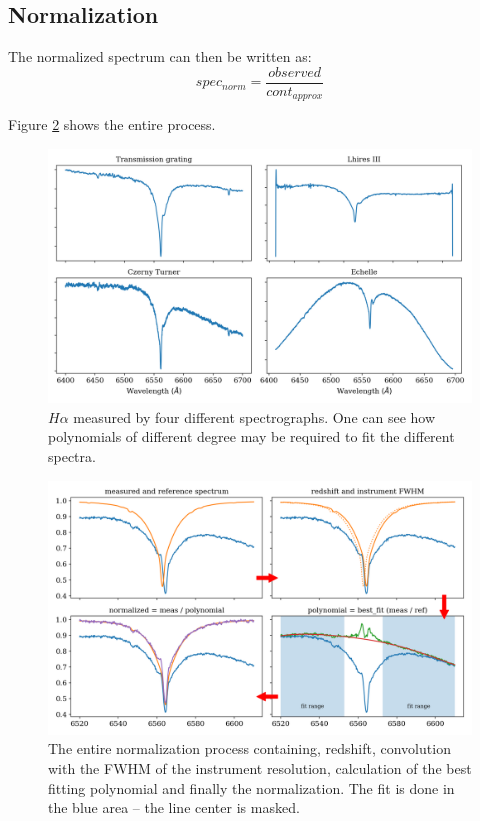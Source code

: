 \documentclass[10pt,a4paper,notitlepage,twocolumn]{article}
\begin{document}
\subsection{Normalization}
The normalized spectrum can then be written as:
\begin{equation}
	spec_{norm} = \frac{observed}{cont_{approx}}
\end{equation}

Figure \ref*{normalize_howto} shows the entire process.

\begin{figure}[h]
	\includegraphics[width=\columnwidth]{img/four_spectra_big.png}
	\caption{$H\alpha$ measured by four different spectrographs. One can see how polynomials of different degree may be required to fit the different spectra.}
	\label{four_spectra}
\end{figure}

\begin{figure}[h]
	\includegraphics[width=\columnwidth]{img/normalize_howto.png}
	\caption{The entire normalization process containing, redshift, convolution with the FWHM of the instrument resolution, calculation of the best fitting polynomial and finally the normalization. The fit is done in the blue area -- the line center is masked.}
	\label{normalize_howto}
\end{figure}
\end{document}
